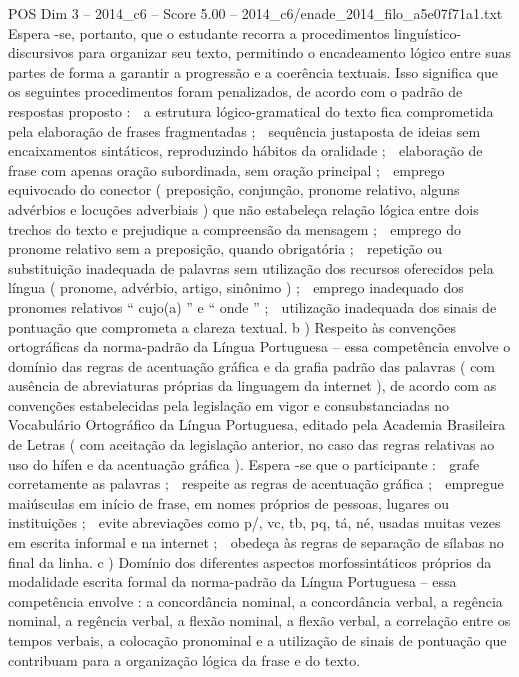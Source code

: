 \begin{textsample}{POS Dim 3 – 2014\_c6 – Score 5.00 – 2014\_c6/enade\_2014\_filo\_a5e07f71a1.txt}
Espera -se, portanto, que o estudante recorra a procedimentos linguístico-discursivos para organizar seu texto, permitindo o encadeamento lógico entre suas partes de forma a garantir a progressão e a coerência textuais.
Isso significa que os seguintes procedimentos foram penalizados, de acordo com o padrão de respostas proposto :  a estrutura lógico-gramatical do texto fica comprometida pela elaboração de frases fragmentadas ;  sequência justaposta de ideias sem encaixamentos sintáticos, reproduzindo hábitos da oralidade ;  elaboração de frase com apenas oração subordinada, sem oração principal ;  emprego equivocado do conector ( preposição, conjunção, pronome relativo, alguns advérbios e locuções adverbiais ) que não estabeleça relação lógica entre dois trechos do texto e prejudique a compreensão da mensagem ;  emprego do pronome relativo sem a preposição, quando obrigatória ;  repetição ou substituição inadequada de palavras sem utilização dos recursos oferecidos pela língua ( pronome, advérbio, artigo, sinônimo ) ;  emprego inadequado dos pronomes relativos “ cujo(a) ” e “ onde ” ;  utilização inadequada dos sinais de pontuação que comprometa a clareza textual. b ) Respeito às convenções ortográficas da norma-padrão da Língua Portuguesa – essa competência envolve o domínio das regras de acentuação gráfica e da grafia padrão das palavras ( com ausência de abreviaturas próprias da linguagem da internet ), de acordo com as convenções estabelecidas pela legislação em vigor e consubstanciadas no Vocabulário Ortográfico da Língua Portuguesa, editado pela Academia Brasileira de Letras ( com aceitação da legislação anterior, no caso das regras relativas ao uso do hífen e da acentuação gráfica ).
Espera -se que o participante :  grafe corretamente as palavras ;  respeite as regras de acentuação gráfica ;  empregue maiúsculas em início de frase, em nomes próprios de pessoas, lugares ou instituições ;  evite abreviações como p/, vc, tb, pq, tá, né, usadas muitas vezes em escrita informal e na internet ;  obedeça às regras de separação de sílabas no final da linha. c ) Domínio dos diferentes aspectos morfossintáticos próprios da modalidade escrita formal da norma-padrão da Língua Portuguesa – essa competência envolve : a concordância nominal, a concordância verbal, a regência nominal, a regência verbal, a flexão nominal, a flexão verbal, a correlação entre os tempos verbais, a colocação pronominal e a utilização de sinais de pontuação que contribuam para a organização lógica da frase e do texto.

\end{textsample}
